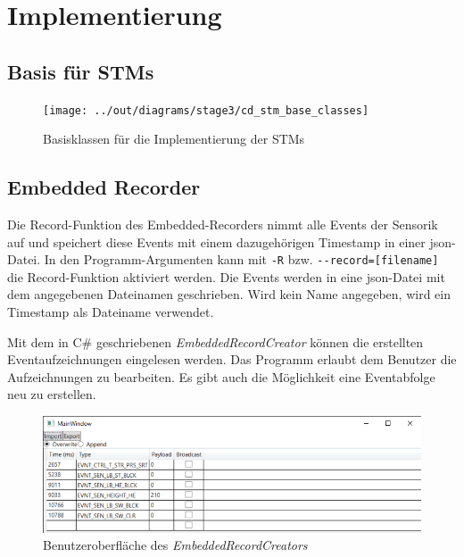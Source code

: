\chapter{Implementierung}\label{ch:implementierung}



\section{Basis für STMs}\label{sec:basis-fuer-stms}

\begin{figure}[h]
    \centering
    \texttt{[image: ../out/diagrams/stage3/cd\_stm\_base\_classes]}
    \caption{Basisklassen für die Implementierung der STMs}
    \label{fig:cd-stm-base}
\end{figure}



\section{Embedded Recorder}\label{sec:embedded-recorder}

Die Record-Funktion des Embedded-Recorders nimmt alle Events der Sensorik auf und
speichert diese Events mit einem dazugehörigen Timestamp in einer json-Datei.
In den Programm-Argumenten kann mit \verb|-R| bzw.
\verb|--record=[filename]| die Record-Funktion aktiviert werden.
Die Events werden in eine json-Datei mit dem angegebenen Dateinamen geschrieben.
Wird kein Name angegeben, wird ein Timestamp als Dateiname verwendet.

Mit dem in C\# geschriebenen \textit{EmbeddedRecordCreator} können die erstellten
Eventaufzeichnungen
eingelesen werden.
Das Programm erlaubt dem Benutzer die Aufzeichnungen zu bearbeiten.
Es gibt auch die Möglichkeit eine Eventabfolge neu zu erstellen.

\begin{figure}[h]
    \centering
    \includegraphics[scale = 0.7]{anhang/EmbeddedRecordCreator.PNG}
    \caption{Benutzeroberfläche des \textit{EmbeddedRecordCreators}}
    \label{fig:embedded-record-creator}
\end{figure}

